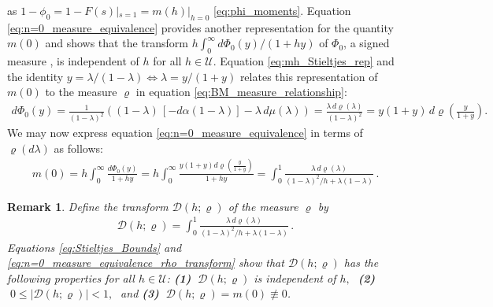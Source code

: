 \documentclass[english,12pt,jmp,graphicx]{revtex4-1}
\newtheorem{remark}{Remark}[section]
\newcommand{\ph}{\hat{\phi}}
\begin{document}
%
as $1-\phi_0=1-F(s)|_{s=1}=m(h)|_{h=0}$ \eqref{eq:phi_moments}. Equation
\eqref{eq:n=0_measure_equivalence} 
provides another representation for the quantity $m(0)$ and
shows that the transform $h\int_0^\infty d\Phi_0(y)/(1+hy)$ of $\Phi_0$, a signed
measure \cite{Rudin:87}, is independent of $h$ for all 
$h\in\mathcal{U}$. Equation \eqref{eq:mh_Stieltjes_rep} and the
identity $y=\lambda/(1-\lambda)\iff\lambda=y/(1+y)$ relates this representation of $m(0)$
to the measure $\varrho$ in equation \eqref{eq:BM_measure_relationship}:         
%
\begin{align*}%
  d\Phi_0(y)%
        =\frac{1}{(1-\lambda)^2}((1-\lambda)\,[-d\alpha(1-\lambda)]-\lambda\,d\mu(\lambda))
        =\frac{\lambda\,d\varrho(\lambda)}{(1-\lambda)^2}=y(1+y)\,d\varrho\left(\frac{y}{1+y}\right).%
\end{align*}
%
We may now express equation \eqref{eq:n=0_measure_equivalence}
in terms of $\varrho(d\lambda)$ as follows: 
%
\begin{align}\label{eq:n=0_measure_equivalence_rho_transform}
  m(0)= h\int_0^\infty\frac{d\Phi_0(y)}{1+hy}
      =h\int_0^\infty\frac{y(1+y)d\varrho(\frac{y}{1+y})}{1+hy}
      =\int_0^1\frac{\lambda\,d\varrho(\lambda)}{(1-\lambda)^2/h+\lambda(1-\lambda)}\,.
\end{align}
%
%
\begin{remark}\label{rem:varrho_conditions}
  Define the transform $\mathcal{D}(h;\varrho)$ of the measure $\varrho$ by
  \begin{align}\label{eq:D_varrho}
    \mathcal{D}(h;\varrho)=\int_0^1\frac{\lambda\,d\varrho(\lambda)}{(1-\lambda)^2/h+\lambda(1-\lambda)}\,.
  \end{align}
  Equations \eqref{eq:Stieltjes_Bounds} and 
  \eqref{eq:n=0_measure_equivalence_rho_transform}
  show that $\mathcal{D}(h;\varrho)$ has the following properties for
  all $h\in\mathcal{U}$:
  \newline
  \textbf{(1)} $\;\mathcal{D}(h;\varrho)$ is independent of $h,\;$ \textbf{(2)}
  $\;0\leq|\mathcal{D}(h;\varrho)|<1,\;$ and \textbf{(3)} $\;\mathcal{D}(h;\varrho)=m(0)\not\equiv0$. 
%  
\end{remark}
\end{document}
